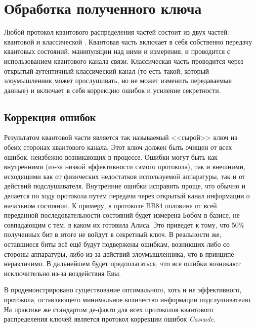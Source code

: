 \section{Обработка полученного ключа}
Любой протокол квантового распределения частей состоит из двух частей: квантовой и классической \cite{gisin2002Quacry}. Квантовая часть включает в себя собственно передачу квантовых состояний, манипуляции над ними и измерения, и проводится с использованием квантового канала связи. Классическая часть проводится через открытый аутентичный классический канал (то есть такой, который злоумышленник может прослушивать, но не может изменить передаваемые данные) и включает в себя коррекцию ошибок и усиление секретности. 

\subsection{Коррекция ошибок}
Результатом квантовой части является так называемый <<сырой>> ключ на обеих сторонах квантового канала. Этот ключ должен быть очищен от всех ошибок, неизбежно возникающих в процессе. Ошибки могут быть как внутренними (из-за низкой эффективности самого протокола), так и внешними, исходящими как от физических недостатков используемой аппаратуры, так и от действий подслушивателя. Внутренние ошибки исправить проще, что обычно и делается по ходу протокола путем передачи через открытый канал информации о начальном состоянии. К примеру, в протоколе BB84\cite{bb84} половина от всей переданной последовательности состояний будет измерена Бобом в базисе, не совпадающим с тем, в каком их готовила Алиса. Это приведет к тому, что 50\% полученных бит в итоге не войдут в секретный ключ. В реальности же, оставшиеся биты всё ещё будут подвержены ошибкам, возникших либо со стороны аппаратуры, либо из-за действий злоумышленника, что в принципе неразличимо. В дальнейшем будет предполагаться, что все ошибки возникают исключительно из-за воздействия Евы.

В \cite{information_reconcilation} продемонстрировано существование оптимального, хоть и не эффективного, протокола, оставляющего минимальное количество информации подслушивателю. На практике же стандартом де-факто для всех протоколов квантового распределения ключей является протокол коррекции ошибок \textit{Cascade}.

